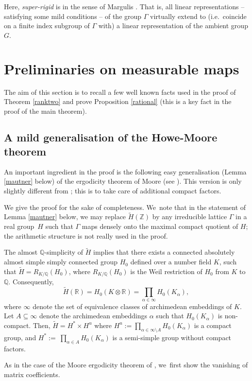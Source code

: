 \documentclass[10pt,a4paper]{amsart}
\newcommand{\ie}{i.e.\ }
\theoremstyle{definition}
\newcommand{\field}[1]{\mathbb{#1}}
\newcommand{\Q}{\field{Q}}
\newcommand{\R}{\field{R}}
\newcommand{\Z}{\field{Z}}
\let\G\Gamma
\begin{document}
Here, \emph{super-rigid} is in the sense of Margulis \cite{M}. That is, all linear representations -- satisfying some mild conditions -- of the group $\Gamma$ virtually extend to (\ie coincide on a finite index
subgroup of $\Gamma$ with) a linear representation of the ambient group $G$.

\section{Preliminaries on measurable maps}

The aim of this section is to recall a few well known facts used in the proof of Theorem \ref{ranktwo} and prove Proposition \ref{rational} (this is a key fact in the proof of the main theorem).

\subsection{A mild generalisation of the Howe-Moore theorem}

An important ingredient in the proof is the following easy generalisation (Lemma \ref{mautner} below) of the ergodicity theorem of Moore (see \cite[Th.\,(2.2.6)]{Z}). This version is only slightly different from \cite[Th.\,(2.2.6)]{Z}; this is to take care of additional compact factors.

We give the proof for the sake of completeness. We~note that in the statement of Lemma \ref{mautner} below,
we may replace $\tilde{H}(\Z)$ by any irreducible lattice $\G$ in a real group~$H$ such that $\G$ maps densely
onto the maximal compact quotient of $H$; the arithmetic structure is not really used in the proof.

The almost $\Q$-simplicity of $\tilde H$ implies that there exists a connected absolutely almost simple simply connected group $H_0$ defined over a number field $K$, such that $\tilde H=R_{K/\Q}(H_0)$,
where $R_{K/\Q}(H_0)$ is the Weil restriction of $H_0$ from $K$ to $\Q$. Consequently,
\[
\tilde H (\R)=H_0(K\otimes \R)=\prod_{\alpha \in \infty} H_0(K_{\alpha}),
\]
where $\infty$ denote the set of equivalence
classes of archimedean embeddings of $K$. Let $A\subseteq\infty$ denote the archimedean embeddings $\alpha$ such that $H_0(K_{\alpha})$ is non-compact. Then, $\tilde H= H^*\times H^u$ where $H^u:=\prod
_{\alpha \in \infty \setminus A} H_0(K_{\alpha })$ is a compact group, and $H^*:= ~\prod_{\alpha \in A} H_0(K_{\alpha})$ is a semi-simple group without compact factors.

As in the case of the Moore ergodicity theorem of \cite{Z}, we~first show the vanishing of matrix coefficients.
\end{document}

